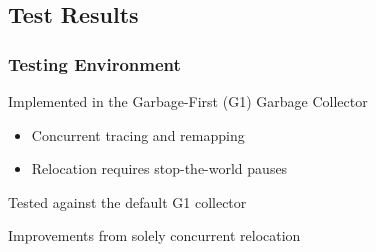 \documentclass{beamer}
\newcommand{\linespace}{\vskip 0.25cm}
\begin{document}
%
%
%
%
%



\subsection*{Test Results}

\begin{frame}

\frametitle{Testing Environment}

Implemented in the Garbage-First (G1) Garbage Collector
\begin{itemize}
\item Concurrent tracing and remapping
\item Relocation requires stop-the-world pauses
\end{itemize}

\linespace
\linespace

Tested against the default G1 collector

\linespace
\linespace

Improvements from solely concurrent relocation

\end{frame}
\end{document}
